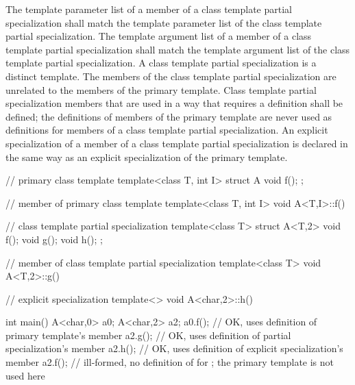 \pnum
The template parameter list of a member of a class template partial
specialization shall match the template parameter list of the class template
partial specialization.
The template argument list of a member of a class template partial
specialization shall match the template argument list of the class template
partial specialization.
A class template partial specialization is a distinct template.
The members of the class template partial specialization are
unrelated to the members of the primary template.
Class template partial specialization members that are used in a way that
requires a definition shall be defined; the definitions of members of the
primary template are never used as definitions for members of a class
template partial specialization.
An explicit specialization of a member of a class template partial
specialization is declared in the same way as an explicit specialization of
the primary template.
\begin{example}

\begin{codeblock}
// primary class template
template<class T, int I> struct A {
  void f();
};

// member of primary class template
template<class T, int I> void A<T,I>::f() { }

// class template partial specialization
template<class T> struct A<T,2> {
  void f();
  void g();
  void h();
};

// member of class template partial specialization
template<class T> void A<T,2>::g() { }

// explicit specialization
template<> void A<char,2>::h() { }

int main() {
  A<char,0> a0;
  A<char,2> a2;
  a0.f();           // OK, uses definition of primary template's member
  a2.g();           // OK, uses definition of partial specialization's member
  a2.h();           // OK, uses definition of explicit specialization's member
  a2.f();           // ill-formed, no definition of  for ; the primary template is not used here
}
\end{codeblock}
\end{example}

